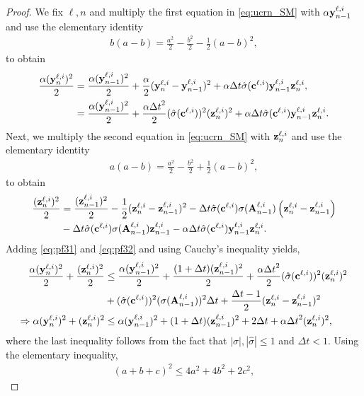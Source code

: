 \documentclass{article}
\newcommand{\Dt}{{\Delta t}}
\newcommand{\byli}{{\bf y}^{\ell,i}}
\newcommand{\bzli}{{\bf z}^{\ell,i}}
\newcommand{\cli}{\hat{\sigma}({\bf c}^{\ell,i})}
\newcommand{\sli}{\sigma({\bf A}^{\ell,i}_{n-1})}
\begin{document}
\begin{proof}
We fix $\ell,n$ and multiply the first equation in \eqref{eq:ucrn_SM} with $\alpha \byli_{n-1}$ and use the elementary identity 
\begin{align*}
b(a-b) = \frac{a^2}{2} -\frac{b^2}{2} - \frac{1}{2}(a-b)^2,
\end{align*}
to obtain
\begin{equation}
    \label{eq:pf31}
    \begin{aligned}
    \frac{\alpha (\byli_n)^2}{2} &= \frac{\alpha (\byli_{n-1})^2}{2} + \frac{\alpha}{2}(\byli_n-\byli_{n-1})^2 + \alpha \Dt \cli\byli_{n-1}\bzli_n, \\
    &= \frac{\alpha (\byli_{n-1})^2}{2}  + \frac{\alpha \Dt^2}{2}(\cli)^2 (\bzli_n)^2 + \alpha \Dt \cli\byli_{n-1}\bzli_n.
    \end{aligned}
\end{equation}
Next, we multiply the second equation in \eqref{eq:ucrn_SM} with $\bzli_{n}$ and use the elementary identity 
\begin{align*}
a(a-b) = \frac{a^2}{2} -\frac{b^2}{2} + \frac{1}{2}(a-b)^2,
\end{align*}
to obtain
\begin{equation}
    \label{eq:pf32}
    \begin{aligned}
    \frac{(\bzli_n)^2}{2} &=   \frac{(\bzli_{n-1})^2}{2} - \frac{1}{2}(\bzli_n-\bzli_{n-1})^2 - \Dt\cli\sli\left(\bzli_n-\bzli_{n-1}\right) \\
    &- \Dt \cli\sli\bzli_{n-1} - \alpha \Dt \cli\byli_{n-1}\bzli_n.
\end{aligned}
\end{equation}
Adding \eqref{eq:pf31} and \eqref{eq:pf32} and using Cauchy's inequality yields,
\begin{align*}
     \frac{\alpha (\byli_n)^2}{2} + \frac{(\bzli_n)^2}{2} &\leq  \frac{\alpha (\byli_{n-1})^2}{2} + \frac{(1+\Dt)(\bzli_{n-1})^2}{2} +  \frac{\alpha \Dt^2}{2}(\cli)^2 (\bzli_n)^2\\
     &+ (\cli)^2(\sli)^2\Dt + \frac{\Dt -1}{2}(\bzli_n-\bzli_{n-1})^2 \\
\Rightarrow  \alpha (\byli_n)^2 +  (\bzli_n)^2  &\leq \alpha (\byli_{n-1})^2 + (1+\Dt)(\bzli_{n-1})^2 + 2\Dt + \alpha \Dt^2 (\bzli_n)^2,
\end{align*}
where the last inequality follows from the fact that $|\sigma|,|\hat{\sigma}| \leq 1$ and $\Dt < 1$.
Using the elementary inequality,
\begin{align*}
    (a + b + c)^2 \leq 4a^2 + 4b^2 + 2c^2,

\end{align*}
\end{proof}
\end{document}
